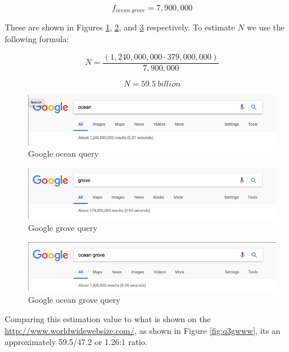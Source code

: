 \documentclass[letterpaper,11pt]{article}
\begin{document}
\begin{equation*}
	f_{ocean\ grove} = 7,900,000
\end{equation*}

These are shown in Figures \ref{fig:q3g1}, \ref{fig:q3g2}, and \ref{fig:q3g3} respectively. To estimate $N$ we use the following formula:

\begin{equation*}
	N = \frac{(1,240,000,000 \cdot 379,000,000)}{7,900,000}
\end{equation*}

\begin{equation*}
	N = 59.5 \ billion
\end{equation*}

\begin{figure}[h]
\centering
\includegraphics[scale=0.4]{google1.png}
\caption{Google ocean query}
\label{fig:q3g1}
\end{figure}

\begin{figure}[h]
\centering
\includegraphics[scale=0.4]{google2.png}
\caption{Google grove query}
\label{fig:q3g2}
\end{figure}

\begin{figure}[h]
\centering
\includegraphics[scale=0.4]{google3.png}
\caption{Google ocean grove query}
\label{fig:q3g3}
\end{figure}

\clearpage

Comparing this estimation value to what is shown on the \url{http://www.worldwidewebsize.com/}, as shown in Figure \ref{fig:q3gwww}, its an approximately 59.5/47.2 or 
1.26:1 ratio.
\end{document}
